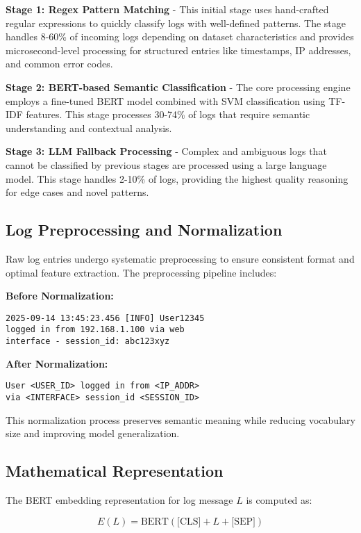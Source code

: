 \documentclass[conference]{IEEEtran}
\begin{document}
\textbf{Stage 1: Regex Pattern Matching} - This initial stage uses hand-crafted regular expressions to quickly classify logs with well-defined patterns. The stage handles 8-60\% of incoming logs depending on dataset characteristics and provides microsecond-level processing for structured entries like timestamps, IP addresses, and common error codes.

\textbf{Stage 2: BERT-based Semantic Classification} - The core processing engine employs a fine-tuned BERT model combined with SVM classification using TF-IDF features. This stage processes 30-74\% of logs that require semantic understanding and contextual analysis.

\textbf{Stage 3: LLM Fallback Processing} - Complex and ambiguous logs that cannot be classified by previous stages are processed using a large language model. This stage handles 2-10\% of logs, providing the highest quality reasoning for edge cases and novel patterns.

\subsection{Log Preprocessing and Normalization}

Raw log entries undergo systematic preprocessing to ensure consistent format and optimal feature extraction. The preprocessing pipeline includes:

\textbf{Before Normalization:}
\begin{verbatim}
2025-09-14 13:45:23.456 [INFO] User12345 
logged in from 192.168.1.100 via web 
interface - session_id: abc123xyz
\end{verbatim}

\textbf{After Normalization:}
\begin{verbatim}
User <USER_ID> logged in from <IP_ADDR> 
via <INTERFACE> session_id <SESSION_ID>
\end{verbatim}

This normalization process preserves semantic meaning while reducing vocabulary size and improving model generalization.

\subsection{Mathematical Representation}

The BERT embedding representation for log message $L$ is computed as:

\begin{equation}
E(L) = \text{BERT}(\text{[CLS]} + L + \text{[SEP]})
\end{equation}
\end{document}
